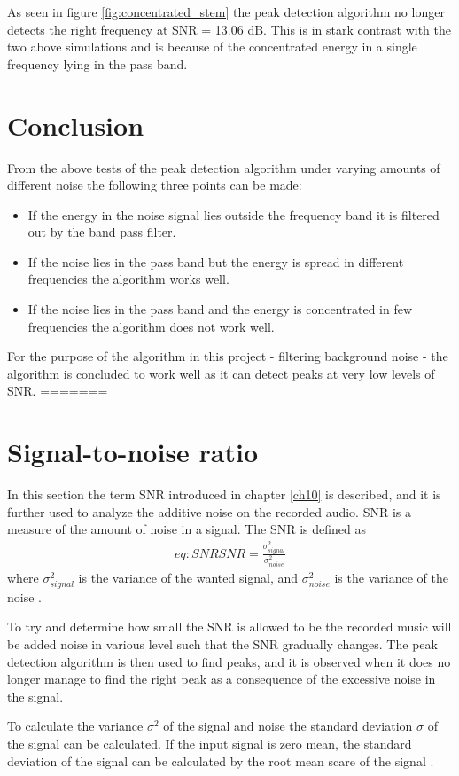 As seen in figure \ref{fig:concentrated_stem} the peak detection algorithm no longer detects the right frequency at SNR = 13.06 dB. This is in stark contrast with the two above simulations and is because of the concentrated energy in a single frequency lying in the pass band.
\section{Conclusion}
From the above tests of the peak detection algorithm under varying amounts of different noise the following three points can be made:
\begin{itemize}
\item If the energy in the noise signal lies outside the frequency band it is filtered out by the band pass filter.
\item If the noise lies in the pass band but the energy is spread in different frequencies the algorithm works well.
\item If the noise lies in the pass band and the energy is concentrated in few frequencies the algorithm does not work well.
\end{itemize}
For the purpose of the algorithm in this project - filtering background noise - the algorithm is concluded to work well as it can detect peaks at very low levels of SNR.
=======
\section{Signal-to-noise ratio}
In this section the term SNR introduced in chapter \ref{ch10} is described, and it is further used to analyze the additive noise on the recorded audio.
SNR is a measure of the amount of noise in a signal. 
The SNR is defined as
\begin{align} {eq:SNR}
	SNR=\frac{\sigma_{signal}^2}{\sigma_{noise}^2}
\end{align}
where $\sigma_{signal}^2$ is the variance of the wanted signal, and $\sigma_{noise}^2$ is the variance of the noise \cite{page 228, DTSP}.

To try and determine how small the SNR is allowed to be the recorded music will be added noise in various level such that the SNR gradually changes.
The peak detection algorithm is then used to find peaks, and it is observed when it does no longer manage to find the right peak as a consequence of the excessive noise in the signal.

To calculate the variance $\sigma^2$ of the signal and noise the standard deviation $\sigma$ of the signal can be calculated. 
If the input signal is zero mean, the standard deviation of the signal can be calculated by the root mean scare of the signal \cite{page 228, DTSP}.

